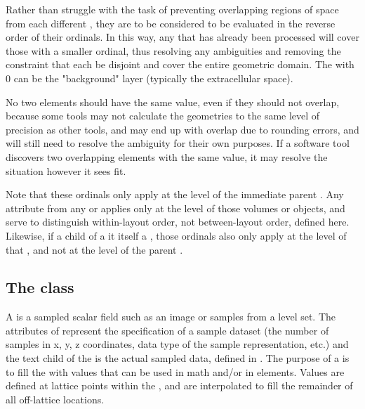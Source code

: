 Rather than struggle with the task of preventing overlapping regions of space from each different \GeometryDefinition, they are to be considered to be evaluated in the reverse order of their ordinals.  In this way, any \GeometryDefinition that has already been processed will cover those with a smaller ordinal, thus resolving any ambiguities and removing the constraint that each \GeometryDefinition be disjoint and cover the entire geometric domain.  The \GeometryDefinition with  0 can be the "background" layer (typically the extracellular space).  

No two \GeometryDefinition elements should have the same  value, even if they should not overlap, because some tools may not calculate the geometries to the same level of precision as other tools, and may end up with overlap due to rounding errors, and will still need to resolve the ambiguity for their own purposes.  If a software tool discovers two overlapping \GeometryDefinition elements with the same  value, it may resolve the situation however it sees fit.

Note that these ordinals only apply at the level of the immediate parent \MixedGeometry.  Any  attribute from any \AnalyticVolume or \CSGObject applies only at the level of those volumes or objects, and serve to distinguish within-\GeometryDefinition layout order, not between-\GeometryDefinition layout order, defined here.  Likewise, if a \GeometryDefinition child of a \MixedGeometry it itself a \MixedGeometry, those ordinals also only apply at the level of that \MixedGeometry, and not at the level of the parent \MixedGeometry.


\subsection{The  class}
\label{sampledfield-class}
A \SampledField is a sampled scalar field such as an image or samples from a level set. The attributes of \SampledField represent the specification of a sample dataset (the number of samples in x, y, z coordinates, data type of the sample representation, etc.) and the text child of the \SampledField is the actual sampled data, defined in .  The purpose of a \SampledField is to fill the \Geometry with values that can be used in math and/or in \SampledFieldGeometry elements.  Values are defined at lattice points within the \Geometry, and are interpolated to fill the remainder of all off-lattice locations.

